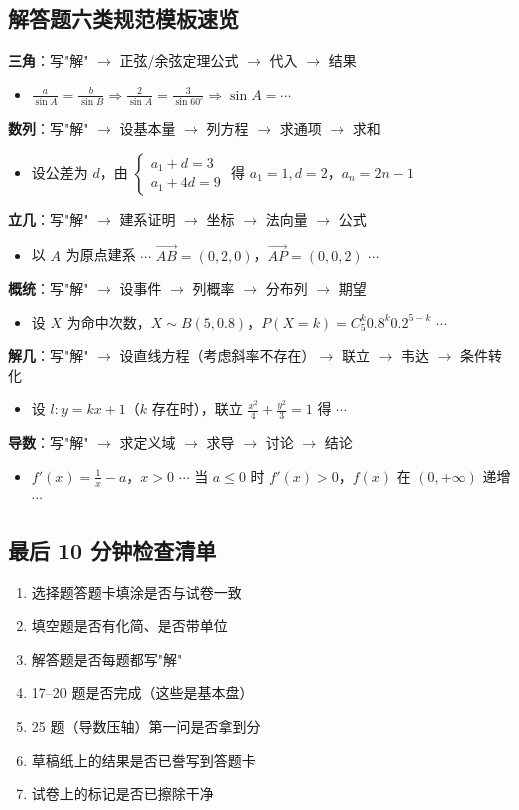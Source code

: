 \subsection{解答题六类规范模板速览}

\textbf{三角}：写"解" $\to$ 正弦/余弦定理公式 $\to$ 代入 $\to$ 结果
\begin{itemize}
  \item $\frac{a}{\sin A} = \frac{b}{\sin B} \Rightarrow \frac{2}{\sin A} = \frac{3}{\sin 60^\circ} \Rightarrow \sin A = \cdots$
\end{itemize}

\textbf{数列}：写"解" $\to$ 设基本量 $\to$ 列方程 $\to$ 求通项 $\to$ 求和
\begin{itemize}
  \item 设公差为 $d$，由 $\begin{cases} a_1+d=3 \\ a_1+4d=9 \end{cases}$ 得 $a_1=1,d=2$，$a_n=2n-1$
\end{itemize}

\textbf{立几}：写"解" $\to$ 建系证明 $\to$ 坐标 $\to$ 法向量 $\to$ 公式
\begin{itemize}
  \item 以 $A$ 为原点建系 $\cdots$ $\overrightarrow{AB}=(0,2,0)$，$\overrightarrow{AP}=(0,0,2)$ $\cdots$
\end{itemize}

\textbf{概统}：写"解" $\to$ 设事件 $\to$ 列概率 $\to$ 分布列 $\to$ 期望
\begin{itemize}
  \item 设 $X$ 为命中次数，$X\sim B(5,0.8)$，$P(X=k)=C_5^k 0.8^k 0.2^{5-k}$ $\cdots$
\end{itemize}

\textbf{解几}：写"解" $\to$ 设直线方程（考虑斜率不存在）$\to$ 联立 $\to$ 韦达 $\to$ 条件转化
\begin{itemize}
  \item 设 $l:y=kx+1$（$k$ 存在时），联立 $\frac{x^2}{4}+\frac{y^2}{3}=1$ 得 $\cdots$
\end{itemize}

\textbf{导数}：写"解" $\to$ 求定义域 $\to$ 求导 $\to$ 讨论 $\to$ 结论
\begin{itemize}
  \item $f'(x)=\frac1x-a$，$x>0$ $\cdots$ 当 $a\le0$ 时 $f'(x)>0$，$f(x)$ 在 $(0,+\infty)$ 递增 $\cdots$
\end{itemize}

\subsection{最后 10 分钟检查清单}

\begin{enumerate}
  \item 选择题答题卡填涂是否与试卷一致
  \item 填空题是否有化简、是否带单位
  \item 解答题是否每题都写"解"
  \item 17--20 题是否完成（这些是基本盘）
  \item 25 题（导数压轴）第一问是否拿到分
  \item 草稿纸上的结果是否已誊写到答题卡
  \item 试卷上的标记是否已擦除干净
\end{enumerate}
